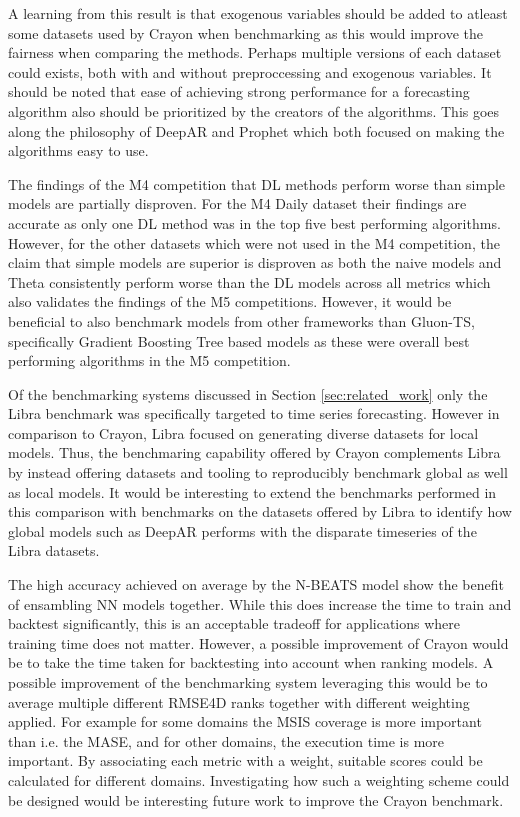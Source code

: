 A learning from this result is that exogenous variables should be added to atleast some datasets used by Crayon when benchmarking as this would improve the fairness when comparing the methods. Perhaps multiple versions of each dataset could exists, both with and without preproccessing and exogenous variables. It should be noted that ease of achieving strong performance for a forecasting algorithm also should be prioritized by the creators of the algorithms. This goes along the philosophy of DeepAR and Prophet which both focused on making the algorithms easy to use.

The findings of the M4 competition that DL methods perform worse than simple models are partially disproven. For the M4 Daily dataset their findings are accurate as only one DL method was in the top five best performing algorithms. However, for the other datasets which were not used in the M4 competition, the claim that simple models are superior is disproven as both the naive models and Theta consistently perform worse than the DL models across all metrics which also validates the findings of the M5 competitions. However, it would be beneficial to also benchmark models from other frameworks than Gluon-TS, specifically Gradient Boosting Tree based models as these were overall best performing algorithms in the M5 competition.

Of the benchmarking systems discussed in Section \ref{sec:related_work} only the Libra benchmark was specifically targeted to time series forecasting. However in comparison to Crayon, Libra focused on generating diverse datasets for local models. Thus, the benchmaring capability offered by Crayon complements Libra by instead offering datasets and tooling to reproducibly benchmark global as well as local models. It would be interesting to extend the benchmarks performed in this comparison with benchmarks on the datasets offered by Libra to identify how global models such as DeepAR performs with the disparate timeseries of the Libra datasets.

The high accuracy achieved on average by the N-BEATS model show the benefit of ensambling NN models together. While this does increase the time to train and backtest significantly, this is an acceptable tradeoff for applications where training time does not matter. However, a possible improvement of Crayon would be to take the time taken for backtesting into account when ranking models. A possible improvement of the benchmarking system leveraging this would be to average multiple different RMSE4D ranks together with different weighting applied. For example for some domains the MSIS coverage is more important than i.e. the MASE, and for other domains, the execution time is more important. By associating each metric with a weight, suitable scores could be calculated for different domains. Investigating how such a weighting scheme could be designed would be interesting future work to improve the Crayon benchmark.

